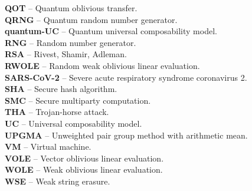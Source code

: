 \textbf{QOT} -- Quantum oblivious transfer.
\vspace{0.5cm}\\
\textbf{QRNG} -- Quantum random number generator.
\vspace{0.5cm}\\
\textbf{quantum-UC} -- Quantum universal composability model.
\vspace{0.5cm}\\
\textbf{RNG} -- Random number generator.
\vspace{0.5cm}\\
\textbf{RSA} -- Rivest, Shamir, Adleman.
\vspace{0.5cm}\\
\textbf{RWOLE} -- Random weak oblivious linear evaluation.
\vspace{0.5cm}\\
\textbf{SARS-CoV-2} -- Severe acute respiratory syndrome coronavirus 2.
\vspace{0.5cm}\\
\textbf{SHA} -- Secure hash algorithm.
\vspace{0.5cm}\\
\textbf{SMC} -- Secure multiparty computation.
\vspace{0.5cm}\\
\textbf{THA} -- Trojan-horse attack.
\vspace{0.5cm}\\
\textbf{UC} -- Universal composability model.
\vspace{0.5cm}\\
\textbf{UPGMA} -- Unweighted pair group method with arithmetic mean.
\vspace{0.5cm}\\
\textbf{VM} -- Virtual machine.
\vspace{0.5cm}\\
\textbf{VOLE} -- Vector oblivious linear evaluation.
\vspace{0.5cm}\\
\textbf{WOLE} -- Weak oblivious linear evaluation.
\vspace{0.5cm}\\
\textbf{WSE} -- Weak string erasure.
\vspace{0.5cm}\\








